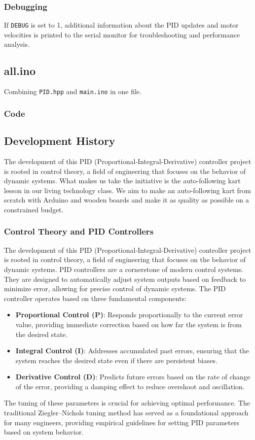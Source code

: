 \documentclass[a4paper,12pt]{article}
\begin{document}
\subsubsection{Debugging}
If \texttt{DEBUG} is set to 1, additional information about the PID updates and motor velocities is printed to the serial monitor for troubleshooting and performance analysis.
\subsection{all.ino}
Combining \texttt{PID.hpp} and \texttt{main.ino} in one file.
\subsubsection{Code}

\subsection{Development History}
The development of this PID (Proportional-Integral-Derivative) controller project is rooted in control theory, a field of engineering that focuses on the behavior of dynamic systems. What makes us take the initiative is the auto-following kart lesson in our living technology class. We aim to make an auto-following kart from scratch with Arduino and wooden boards and make it as quality as possible on a constrained budget.
\subsubsection{Control Theory and PID Controllers}
The development of this PID (Proportional-Integral-Derivative) controller project is rooted in control theory, a field of engineering that focuses on the behavior of dynamic systems. PID controllers are a cornerstone of modern control systems. They are designed to automatically adjust system outputs based on feedback to minimize error, allowing for precise control of dynamic systems. The PID controller operates based on three fundamental components:
\begin{itemize}
\item \textbf{Proportional Control (P)}: Responds proportionally to the current error value, providing immediate correction based on how far the system is from the desired state.
\item \textbf{Integral Control (I)}: Addresses accumulated past errors, ensuring that the system reaches the desired state even if there are persistent biases.
\item \textbf{Derivative Control (D)}: Predicts future errors based on the rate of change of the error, providing a damping effect to reduce overshoot and oscillation.
\end{itemize}
The tuning of these parameters is crucial for achieving optimal performance. The traditional Ziegler–Nichols tuning method has served as a foundational approach for many engineers, providing empirical guidelines for setting PID parameters based on system behavior.
\end{document}
